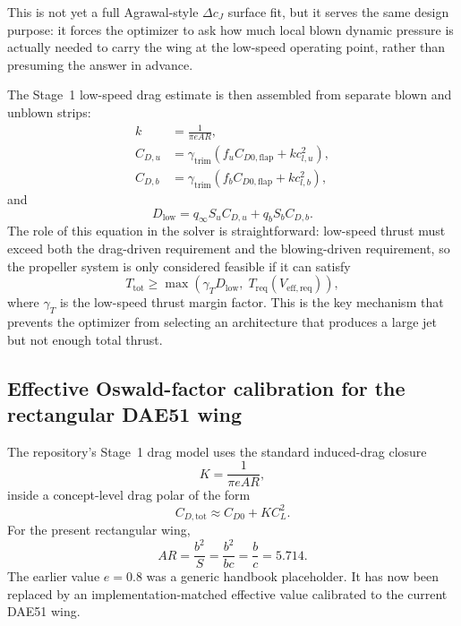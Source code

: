 \documentclass[conf]{new-aiaa}
\begin{document}
This is not yet a full Agrawal-style \(\Delta c_J\) surface fit, but it serves the same design purpose: it forces the optimizer to ask how much local blown dynamic pressure is actually needed to carry the wing at the low-speed operating point, rather than presuming the answer in advance.\cite{Agrawal2019}

The Stage~1 low-speed drag estimate is then assembled from separate blown and unblown strips:
\begin{align}
k &= \frac{1}{\pi e AR}, \\
C_{D,u} &= \gamma_{\mathrm{trim}}
\left(f_{u} C_{D0,\mathrm{flap}} + k c_{l,u}^{2}\right), \\
C_{D,b} &= \gamma_{\mathrm{trim}}
\left(f_{b} C_{D0,\mathrm{flap}} + k c_{l,b}^{2}\right),
\end{align}
and
\begin{equation}
D_{\mathrm{low}} = q_\infty S_u C_{D,u} + q_b S_b C_{D,b}.
\end{equation}
The role of this equation in the solver is straightforward: low-speed thrust must exceed both the drag-driven requirement and the blowing-driven requirement, so the propeller system is only considered feasible if it can satisfy
\begin{equation}
T_{\mathrm{tot}} \ge \max\!\left(\gamma_T D_{\mathrm{low}},\; T_{\mathrm{req}}(V_{\mathrm{eff,req}})\right),
\end{equation}
where \(\gamma_T\) is the low-speed thrust margin factor. This is the key mechanism that prevents the optimizer from selecting an architecture that produces a large jet but not enough total thrust.

\subsection{Effective Oswald-factor calibration for the rectangular DAE51 wing}

The repository's Stage~1 drag model uses the standard induced-drag closure
\begin{equation}
K = \frac{1}{\pi e AR},
\end{equation}
inside a concept-level drag polar of the form
\begin{equation}
C_{D,\mathrm{tot}} \approx C_{D0} + K C_L^2.
\end{equation}
For the present rectangular wing,
\begin{equation}
AR = \frac{b^2}{S} = \frac{b^2}{bc} = \frac{b}{c} = 5.714.
\end{equation}
The earlier value \(e=0.8\) was a generic handbook placeholder. It has now been replaced by an implementation-matched effective value calibrated to the current DAE51 wing.
\end{document}
